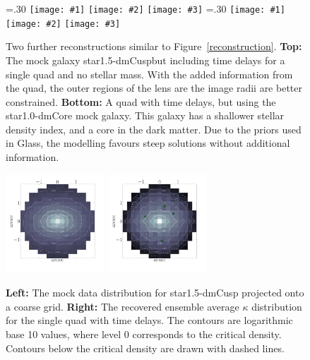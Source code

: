 \documentclass[galley,usenatbib]{mn2e}
\newcommand{\Glass}{{\sc Glass}}
\newcommand{\figref}[1] {Figure~\ref{#1}}
\newcommand{\mockAA}{{\sc star1.0-dmCore}}
\newcommand{\mockBC}{{\sc star1.5-dmCusp}}
\newcommand\plotthree[3]{{%
 \centering
 \leavevmode
 \columnwidth=.30\textwidth
 \texttt{[image: \#1]}%
 \hfil
 \texttt{[image: \#2]}%
 \hfil
 \texttt{[image: \#3]}%
}}%
\begin{document}
\begin{figure}
  \plotthree{BCQuadR1a_Tms-a.pdf} {BCQuadR1a_Tms-b.pdf} {BCQuadR1a_Tms-c.pdf}
  \plotthree{AAQuadR1a_Tms-a.pdf} {AAQuadR1a_Tms-b.pdf} {AAQuadR1a_Tms-c.pdf}
\caption{
    Two further reconstructions similar to \figref{reconstruction}.
    \textbf{Top:} The mock galaxy \mockBC but including time delays for a
    single quad and no stellar mass. With the added information from the quad,
    the outer regions of the lens are the image radii are better constrained.
    \textbf{Bottom:} A quad with time delays, but using the \mockAA{} mock
    galaxy. This galaxy has a shallower stellar density index, and a core in
    the dark matter. Due to the priors used in \Glass, the modelling favours
    steep solutions without additional information.
}
\label{reconstruction 2}
\end{figure}

\begin{figure}
\includegraphics[width=0.33\textwidth]{BCQuadR1a_TmS-kappa-a.pdf}
\includegraphics[width=0.33\textwidth]{BCQuadR1a_TmS-kappa-b.pdf}
\caption{ \textbf{Left:} The mock data distribution for \mockBC{} projected
onto a coarse grid.  \textbf{Right:} The recovered ensemble average $\kappa$
distribution for the single quad with time delays. The contours are logarithmic
base 10 values, where level 0 corresponds to the critical density. Contours
below the critical density are drawn with dashed lines.}
\label{2d mass reconstruction}
\end{figure}
\end{document}
